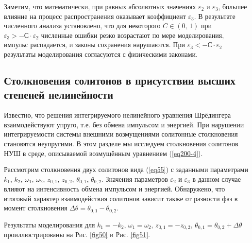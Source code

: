 \documentclass[14pt,a4paper]{extreport}
\begin{document}
			Заметим, что математически, при равных абсолютных значениях \(\varepsilon_{2}\) и \(\varepsilon_{3}\), большее влияние на процесс распространения оказывает коэффициент \(\varepsilon_{3}\). В результате численного анализа установлено, что для некоторого \(C \in (0,\,1)\) при \(\varepsilon_{3} > -С \cdot \varepsilon_{2}\) численные ошибки резко возрастают по мере моделирования, импульс распадается, и законы сохранения нарушаются. При \(\varepsilon_{3} < -С \cdot \varepsilon_{2}\) результаты моделирования согласуются с физическими законами.
		\subsection{Столкновения солитонов в присутствии высших степеней нелинейности}\label{ch350}
			Известно, что решения интегрируемого нелинейного уравнения Шрёдингера взаимодействуют упруго, т.е. без обмена импульсом и энергией. При нарушении интегрируемости системы внешними возмущениями солитонные столкновения становятся неупругими. В этом разделе мы исследуем столкновения солитонов НУШ в среде, описываемой возмущённым уравнением (\ref{eq200-4}).

			Рассмотрим столкновения двух солитонов вида (\ref{eq55}) с заданными параметрами \(k_{1},\,k_{2},\,\omega_{1},\,\omega_{2},\,z_{0,1},\,z_{0,2},\,\theta_{0,1},\,\theta_{0,2}\). Значения параметров \(\varepsilon_{2}\) и \(\varepsilon_{3}\) в данном случае влияют на интенсивность обмена импульсом и энергией. Обнаружено, что итоговый характер взаимодействия солитонов зависит также от разности фаз в момент столкновения \(\Delta \theta=\theta_{0,1}-\theta_{0,2}\).
		
			Результаты моделирования для \(k_{1}=-k_{2},\,\omega_{1}=\omega_{2},\,z_{0,1}=-z_{0,2},\,\theta_{0,1}=\theta_{0,2}+\Delta \theta\) проиллюстрированы на Рис. \ref{fig50} и Рис. \ref{fig51}.
\end{document}
